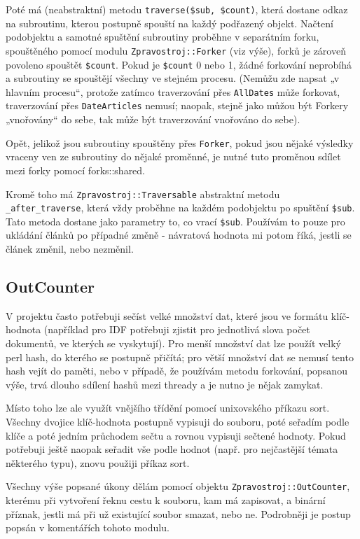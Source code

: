 \documentclass[12pt,a4paper]{report}
\def\uv#1{„#1“}
\begin{document}
Poté má (neabstraktní) metodu \texttt{traverse(\$sub, \$count)}, která dostane odkaz na subroutinu, kterou postupně spouští na každý podřazený objekt. Načtení podobjektu a samotné spuštění subroutiny proběhne v separátním forku, spouštěného pomocí modulu \texttt{Zpravostroj::Forker} (viz výše), forků je zároveň povoleno spouštět \texttt{\$count}. Pokud je \texttt{\$count} 0 nebo 1, žádné forkování neprobíhá a subroutiny se spouštějí všechny ve stejném procesu. (Nemůžu zde napsat \uv{v hlavním procesu}, protože zatímco traverzování přes \texttt{AllDates} může forkovat, traverzování přes \texttt{DateArticles} nemusí; naopak, stejně jako můžou být Forkery \uv{vnořovány} do sebe, tak může být traverzování vnořováno do sebe).

Opět, jelikož jsou subroutiny spouštěny přes \texttt{Forker}, pokud jsou nějaké výsledky vraceny ven ze subroutiny do nějaké proměnné, je nutné tuto proměnou sdílet mezi forky pomocí forks::shared.

Kromě toho má \texttt{Zpravostroj::Traversable} abstraktní metodu \texttt{\_after\_traverse}, která vždy proběhne na každém podobjektu po spuštění \texttt{\$sub}. Tato metoda dostane jako parametry to, co vrací \texttt{\$sub}. Používám to pouze pro ukládání článků po případné změně - návratová hodnota mi potom říká, jestli se článek změnil, nebo nezměnil.

\subsection{OutCounter}

V projektu často potřebuji sečíst velké množství dat, které jsou ve formátu klíč-hodnota (například pro IDF potřebuji zjistit pro jednotlivá slova počet dokumentů, ve kterých se vyskytují). Pro menší množství dat lze použít velký perl hash, do kterého se postupně přičítá; pro větší množství dat se nemusí tento hash vejít do paměti, nebo v případě, že používám metodu forkování, popsanou výše, trvá dlouho sdílení hashů mezi thready a je nutno je nějak zamykat.

Místo toho lze ale využít vnějšího třídění pomocí unixovského příkazu sort. Všechny dvojice klíč-hodnota postupně vypisuji do souboru, poté seřadím podle klíče a poté jedním průchodem sečtu a rovnou vypisuji sečtené hodnoty. Pokud potřebuji ještě naopak seřadit vše podle hodnot (např. pro nejčastější témata některého typu), znovu použiji příkaz sort.

Všechny výše popsané úkony dělám pomocí objektu \texttt{Zpravostroj::OutCounter}, kterému při vytvoření řeknu cestu k souboru, kam má zapisovat, a binární příznak, jestli má při už existující soubor smazat, nebo ne. Podrobněji je postup popsán v komentářích tohoto modulu.
\end{document}
